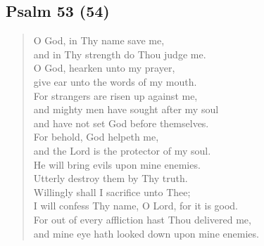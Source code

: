 {		\subsection*{Psalm 53 (54)}
			\begin{verse}
				O God, in Thy name save me,\nolinebreak\\
				and in Thy strength do Thou judge me.\nolinebreak\\
				O God, hearken unto my prayer,\nolinebreak\\
				give ear unto the words of my mouth.\nolinebreak\\
				For strangers are risen up against me,\nolinebreak\\
				and mighty men have sought after my soul\nolinebreak\\
				and have not set God before themselves.\nolinebreak\\
				For behold, God helpeth me,\nolinebreak\\
				and the Lord is the protector of my soul.\nolinebreak\\
				He will bring evils upon mine enemies.\nolinebreak\\
				Utterly destroy them by Thy truth.\nolinebreak\\
				Willingly shall I sacrifice unto Thee;\nolinebreak\\
				I will confess Thy name, O Lord, for it is good.\nolinebreak\\
				For out of every affliction hast Thou delivered me,\nolinebreak\\
				and mine eye hath looked down upon mine enemies.
			\end{verse}
}
